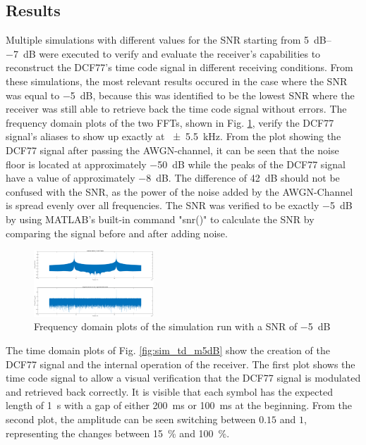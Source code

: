 \documentclass[conference]{IEEEtran}
\begin{document}
\subsection{Results}
Multiple simulations with different values for the SNR starting from \SIrange{5}{-7}{\deci\bel} were executed to verify and evaluate the receiver's capabilities to reconstruct the DCF77's time code signal in different receiving conditions.
From these simulations, the most relevant results occured in the case where the SNR was equal to \SI{-5}{\deci\bel}, because this was identified to be the lowest SNR where the receiver was still able to
retrieve back the time code signal without errors.
The frequency domain plots of the two FFTs, shown in Fig. \ref{fig:sim_fd_m5dB}, verify the DCF77 signal's aliases to show up exactly at \SI{\pm 5.5}{\kilo\hertz}.
From the plot showing the DCF77 signal after passing the AWGN-channel, it can be seen that the noise floor is located at approximately \SI{-50}{\deci\bel} while the peaks
of the DCF77 signal have a value of approximately \SI{-8}{\deci\bel}.
The difference of \SI{42}{\deci\bel} should not be confused with the SNR, as the power of the noise added by the AWGN-Channel is spread evenly over all frequencies.
The SNR was verified to be exactly \SI{-5}{\deci\bel} by using MATLAB's built-in command "snr()" to calculate the SNR by comparing the signal before and after adding noise.
\begin{figure}[!htbp]
    \centerline{\includegraphics[width=0.4\textwidth]{img/sim_fd_m5dB.eps}}
    \caption{Frequency domain plots of the simulation run with a SNR of \SI{-5}{\deci\bel}}
    \label{fig:sim_fd_m5dB}
\end{figure}
\FloatBarrier
The time domain plots of Fig. \ref{fig:sim_td_m5dB} show the creation of the DCF77 signal and the internal operation of the receiver.
The first plot shows the time code signal to allow a visual verification that the DCF77 signal is modulated and retrieved back correctly.
It is visible that each symbol has the expected length of \SI{1}{\second} with a gap of either \SI{200}{\milli\second} or \SI{100}{\milli\second} at the beginning.
From the second plot, the amplitude can be seen switching between $0.15$ and $1$, representing the changes between \SI{15}{\percent} and \SI{100}{\percent}.
\end{document}
